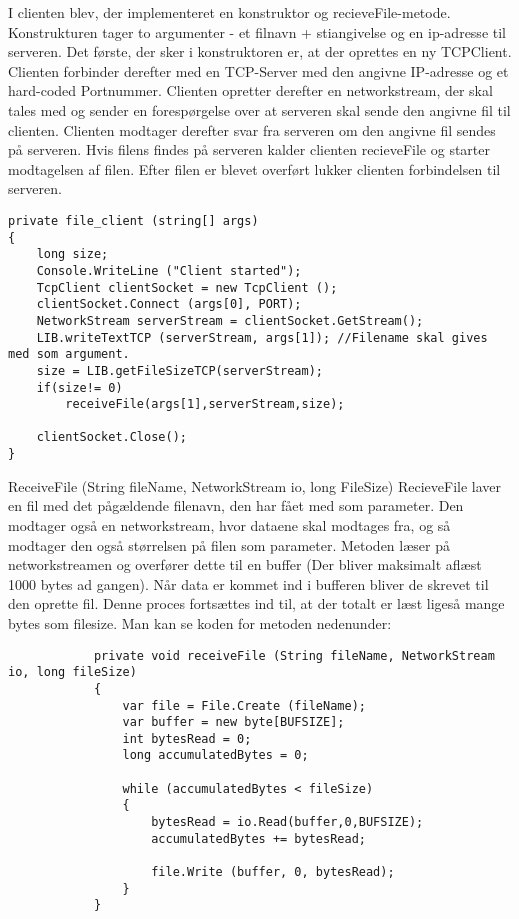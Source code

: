 I clienten blev, der implementeret en konstruktor og recieveFile-metode.
Konstrukturen tager to argumenter - et filnavn + stiangivelse og en ip-adresse til serveren.
Det første, der sker i konstruktoren er, at der oprettes en ny TCPClient. Clienten forbinder derefter med en TCP-Server med den angivne IP-adresse og et hard-coded Portnummer.
Clienten opretter derefter en networkstream, der skal tales med og sender en forespørgelse over at serveren skal sende den angivne fil til clienten. Clienten modtager derefter svar fra serveren om den angivne fil sendes på serveren. Hvis filens findes på serveren kalder clienten recieveFile og starter modtagelsen af filen.
Efter filen er blevet overført lukker clienten forbindelsen til serveren.
\begin{verbatim}
private file_client (string[] args)
{
	long size;
	Console.WriteLine ("Client started");
	TcpClient clientSocket = new TcpClient ();
	clientSocket.Connect (args[0], PORT);
	NetworkStream serverStream = clientSocket.GetStream();
	LIB.writeTextTCP (serverStream, args[1]); //Filename skal gives med som argument.
	size = LIB.getFileSizeTCP(serverStream);
	if(size!= 0)
		receiveFile(args[1],serverStream,size);

	clientSocket.Close();
}
\end{verbatim}

\noindent ReceiveFile (String fileName, NetworkStream io, long FileSize) 
RecieveFile laver en fil med det pågældende filenavn, den har fået med som parameter. Den modtager også en networkstream, hvor dataene skal modtages fra, og så modtager den også størrelsen på filen som parameter.
Metoden læser på networkstreamen og overfører dette til en buffer (Der bliver maksimalt aflæst 1000 bytes ad gangen). Når data er kommet ind i bufferen bliver de skrevet til den oprette fil. Denne proces fortsættes ind til, at der totalt er læst ligeså mange bytes som filesize.
Man kan se koden for metoden nedenunder:

\begin{verbatim}
			private void receiveFile (String fileName, NetworkStream io, long fileSize)
			{
				var file = File.Create (fileName);
				var buffer = new byte[BUFSIZE];
				int bytesRead = 0;
				long accumulatedBytes = 0;
			
				while (accumulatedBytes < fileSize) 
				{
					bytesRead = io.Read(buffer,0,BUFSIZE);
					accumulatedBytes += bytesRead;
			
					file.Write (buffer, 0, bytesRead);
				}
			}
\end{verbatim}